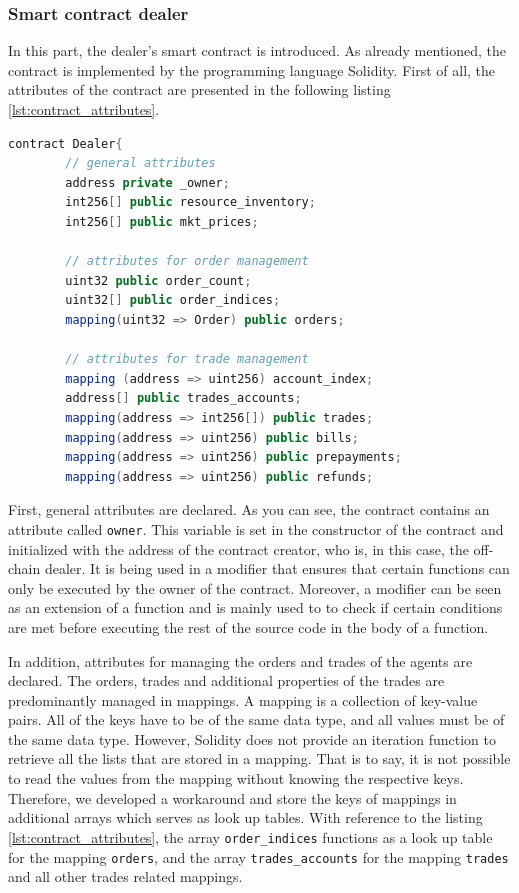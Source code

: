 \subsubsection{Smart contract dealer}
\label{sec:smart_contract_dealer}
In this part, the dealer's smart contract is introduced. 
As already mentioned, the contract is implemented by the programming language Solidity. 
First of all, the attributes of the contract are presented in the following listing \ref{lst:contract_attributes}.

\begin{lstlisting}[float=htbp, label=lst:contract_attributes, caption=Attributes of Smart Contract, language=Java]
    contract Dealer{
        // general attributes
        address private _owner;
        int256[] public resource_inventory;
        int256[] public mkt_prices;

        // attributes for order management
        uint32 public order_count;
        uint32[] public order_indices;
        mapping(uint32 => Order) public orders;

        // attributes for trade management
        mapping (address => uint256) account_index; 
        address[] public trades_accounts;
        mapping(address => int256[]) public trades;
        mapping(address => uint256) public bills;
        mapping(address => uint256) public prepayments;
        mapping(address => uint256) public refunds;
\end{lstlisting}

First, general attributes are declared. As you can see, the contract contains an attribute called \verb|owner|.
This variable is set in the constructor of the contract and initialized with the address of the contract creator,
who is, in this case, the off-chain dealer.  
It is being used in a modifier that ensures that certain functions can only be executed by the owner of the contract.
Moreover, a modifier can be seen as an extension of a function and is mainly used to 
to check if certain conditions are met before executing the rest of the source code in the body of a function.

In addition, attributes for managing the orders and trades of the agents are declared. 
The orders, trades and additional properties of the trades are predominantly managed in mappings.
A mapping is a collection of key-value pairs. All of the keys have to be of the same data type, and 
all values must be of the same data type. However, Solidity does not provide an iteration
function to retrieve all the lists that are stored in a mapping. 
That is to say, it is not possible to read the values from the mapping without knowing the respective keys.
Therefore, we developed a workaround and store the keys of mappings in additional arrays which serves 
as look up tables.
With reference to the listing \ref{lst:contract_attributes}, the array \verb|order_indices| functions as a 
look up table for the mapping \verb|orders|, and the array \verb|trades_accounts| for the mapping 
\verb|trades| and all other trades related mappings.


